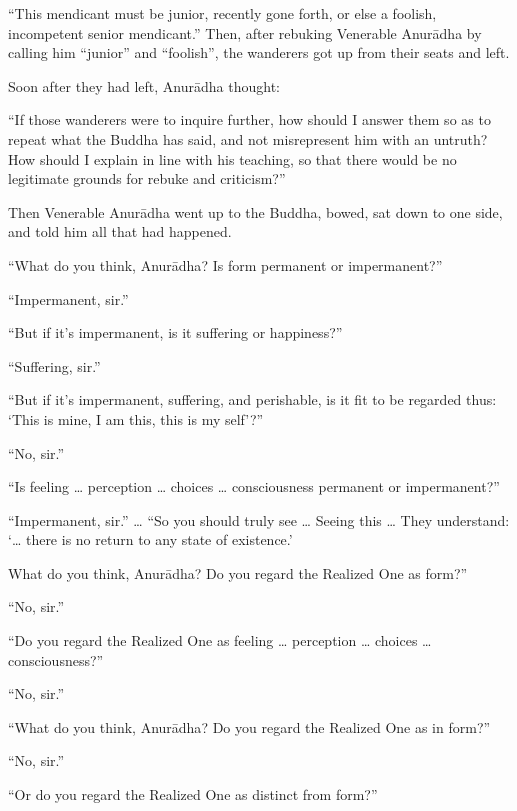 \documentclass[12pt,openany]{book}%
\begin{document}
“This mendicant must be junior, recently gone forth, or else a foolish, incompetent senior mendicant.” Then, after rebuking Venerable \textsanskrit{Anurādha} by calling him “junior” and “foolish”, the wanderers got up from their seats and left. 

Soon after they had left, \textsanskrit{Anurādha} thought: 

“If those wanderers were to inquire further, how should I answer them so as to repeat what the Buddha has said, and not misrepresent him with an untruth? How should I explain in line with his teaching, so that there would be no legitimate grounds for rebuke and criticism?” 

Then Venerable \textsanskrit{Anurādha} went up to the Buddha, bowed, sat down to one side, and told him all that had happened. 

“What do you think, \textsanskrit{Anurādha}? Is form permanent or impermanent?” 

“Impermanent, sir.” 

“But if it’s impermanent, is it suffering or happiness?” 

“Suffering, sir.” 

“But if it’s impermanent, suffering, and perishable, is it fit to be regarded thus: ‘This is mine, I am this, this is my self’?” 

“No, sir.” 

“Is feeling … perception … choices … consciousness permanent or impermanent?” 

“Impermanent, sir.” … “So you should truly see … Seeing this … They understand: ‘… there is no return to any state of existence.’ 

What do you think, \textsanskrit{Anurādha}? Do you regard the Realized One as form?” 

“No, sir.” 

“Do you regard the Realized One as feeling … perception … choices … consciousness?” 

“No, sir.” 

“What do you think, \textsanskrit{Anurādha}? Do you regard the Realized One as in form?” 

“No, sir.” 

“Or do you regard the Realized One as distinct from form?” 
\end{document}

